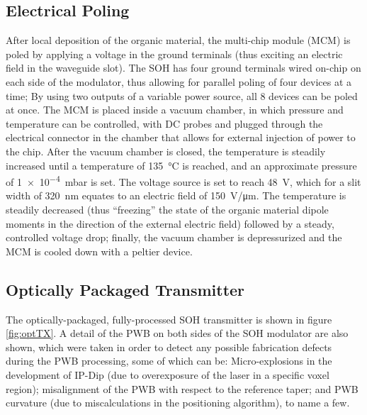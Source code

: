 \subsection{Electrical Poling}
\label{sec:exp:epol}
After local deposition of the organic material, the multi-chip module (MCM) is poled by applying a voltage in the ground terminals (thus exciting an electric field in the waveguide slot). The SOH has four ground terminals wired on-chip on each side of the modulator, thus allowing for parallel poling of four devices at a time; By using two outputs of a variable power source, all 8 devices can be poled at once. The MCM is placed inside a vacuum chamber, in which pressure and temperature can be controlled, with DC probes and plugged through the electrical connector in the chamber that allows for external injection of power to the chip. After the vacuum chamber is closed, the temperature is steadily increased until a temperature of \SI{135}{\celsius} is reached, and an approximate pressure of \SI{1e-4}{\milli\bar} is set. The voltage source is set to reach \SI{48}{\volt}, which for a slit width of \SI{320}{\nano\meter} equates to an electric field of \SI{150}{\volt/\micro\meter}. The temperature is steadily decreased (thus ``freezing'' the state of the organic material dipole moments in the direction of the external electric field) followed by a steady, controlled voltage drop; finally, the vacuum chamber is depressurized and the MCM is cooled down with a peltier device.


\subsection{Optically Packaged Transmitter}

The optically-packaged, fully-processed SOH transmitter is shown in figure \ref{fig:optTX}. A detail of the PWB on both sides of the SOH modulator are also shown, which were taken in order to detect any possible fabrication defects during the PWB processing, some of which can be: Micro-explosions in the development of IP-Dip (due to overexposure of the laser in a specific voxel region); misalignment of the PWB with respect to the reference taper; and PWB curvature (due to miscalculations in the positioning algorithm), to name a few. %

